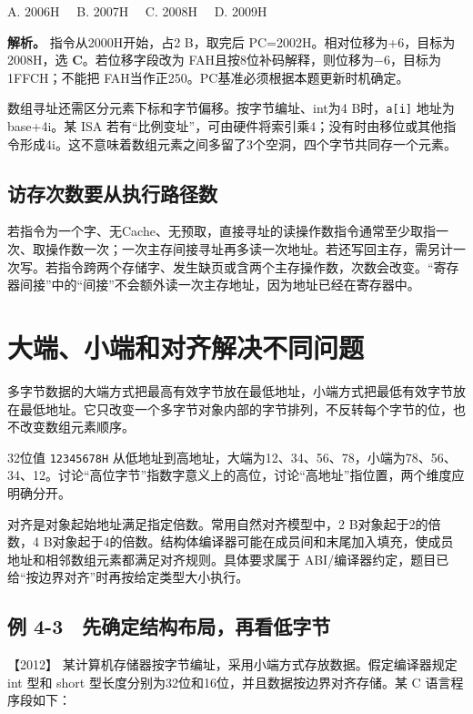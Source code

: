 A. 2006H　 B. 2007H　 C. 2008H　 D. 2009H


\textbf{解析。} 指令从2000H开始，占2 B，取完后 PC=2002H。相对位移为+6，目标为2008H，选 \textbf{C}。若位移字段改为 FAH且按8位补码解释，则位移为−6，目标为1FFCH；不能把 FAH当作正250。PC基准必须根据本题更新时机确定。

数组寻址还需区分元素下标和字节偏移。按字节编址、int为4 B时，\allowbreak{}\texttt{a{[}i{]}} 地址为base+4i。某 ISA 若有``比例变址''，可由硬件将索引乘4；没有时由移位或其他指令形成4i。这不意味着数组元素之间多留了3个空洞，四个字节共同存一个元素。

\subsection{访存次数要从执行路径数}\label{co-c04-h50}

若指令为一个字、无Cache、无预取，直接寻址的读操作数指令通常至少取指一次、取操作数一次；一次主存间接寻址再多读一次地址。若还写回主存，需另计一次写。若指令跨两个存储字、发生缺页或含两个主存操作数，次数会改变。``寄存器间接''中的``间接''不会额外读一次主存地址，因为地址已经在寄存器中。

\section{大端、小端和对齐解决不同问题}\label{co-04-03}

多字节数据的大端方式把最高有效字节放在最低地址，小端方式把最低有效字节放在最低地址。它只改变一个多字节对象内部的字节排列，不反转每个字节的位，也不改变数组元素顺序。

32位值 \allowbreak{}\texttt{12345678H} 从低地址到高地址，大端为12、34、56、78，小端为78、56、34、12。讨论``高位字节''指数字意义上的高位，讨论``高地址''指位置，两个维度应明确分开。

对齐是对象起始地址满足指定倍数。常用自然对齐模型中，2 B对象起于2的倍数，4 B对象起于4的倍数。结构体编译器可能在成员间和末尾加入填充，使成员地址和相邻数组元素都满足对齐规则。具体要求属于 ABI/编译器约定，题目已给``按边界对齐''时再按给定类型大小执行。

\subsection{例 4-3　先确定结构布局，再看低字节}\label{co-ex4-3}

\noindent{}【2012】 某计算机存储器按字节编址，采用小端方式存放数据。假定编译器规定 int 型和 short 型长度分别为32位和16位，并且数据按边界对齐存储。某 C 语言程序段如下：

